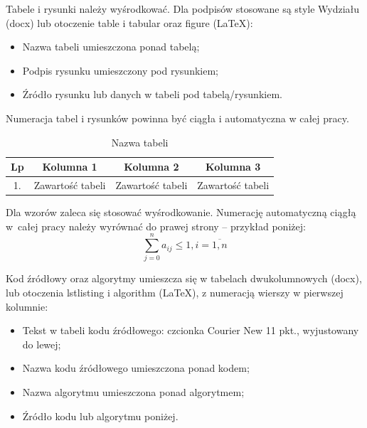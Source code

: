 Tabele i rysunki należy wyśrodkować. Dla podpisów stosowane są style Wydziału (docx) lub otoczenie table i tabular oraz figure (LaTeX):
\begin{itemize}
    \item Nazwa tabeli umieszczona ponad tabelą;
    \item Podpis rysunku umieszczony pod rysunkiem;
    \item Źródło rysunku lub danych w tabeli pod tabelą/rysunkiem.
\end{itemize}
Numeracja tabel i rysunków powinna być ciągła i automatyczna w całej pracy.
\begin{table}[H]
    \caption{Nazwa tabeli}
    \label{tab1}
    \begin{center}
        \begin{tabular}{|c|c|c|c|}
                \hline
                \textbf{Lp}     & \textbf{Kolumna 1}    & \textbf{Kolumna 2}    & \textbf{Kolumna 3}    \\ \hline
                1.              & Zawartość tabeli      & Zawartość tabeli      & Zawartość tabeli   \\ \hline
        \end{tabular}
    \end{center}
\end{table}

Dla wzorów zaleca się stosować wyśrodkowanie. Numerację automatyczną ciągłą w~całej pracy należy wyrównać do prawej strony – przykład poniżej:
\begin{equation}
    \label{eq1}
    \displaystyle \sum_{j=0}^{n}a_{ij} \leq 1, i = \overline{1, n}
\end{equation}

Kod źródłowy oraz algorytmy umieszcza się w tabelach dwukolumnowych (docx), lub otoczenia lstlisting i algorithm (LaTeX), z numeracją wierszy w pierwszej kolumnie:
\begin{itemize}
    \item Tekst w tabeli kodu źródłowego: czcionka Courier New 11 pkt., wyjustowany do lewej;
    \item Nazwa kodu źródłowego umieszczona ponad kodem;
    \item Nazwa algorytmu umieszczona ponad algorytmem;
    \item Źródło kodu lub algorytmu poniżej.
\end{itemize}

